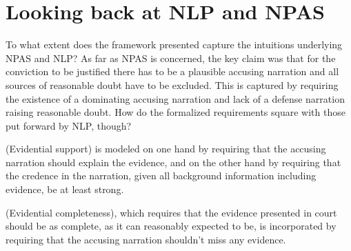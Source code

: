 \documentclass[10pt,leqno]{article}
\begin{document}
\section{Looking back at NLP and NPAS}
\label{sec:looking_back_at_NLP_and_NPAS}


To what extent does  the framework presented capture the intuitions underlying NPAS and NLP? As far as NPAS is concerned, the key claim was that for the conviction to be justified there has to be a plausible accusing narration and all sources of reasonable doubt have to be excluded. This is captured by requiring the existence of a dominating accusing narration and lack of a defense narration raising reasonable doubt. How do the formalized requirements square with those put forward by NLP, though?

(Evidential support)  is modeled  on  one hand by requiring that the accusing narration should explain the evidence, and on the other hand by requiring that the credence in the narration, given all background information including evidence, be at least strong. 



(Evidential completeness), which requires that the evidence presented in court should be as complete, as it can reasonably expected to be, is incorporated by requiring that the accusing narration shouldn't miss any evidence.
\end{document}
